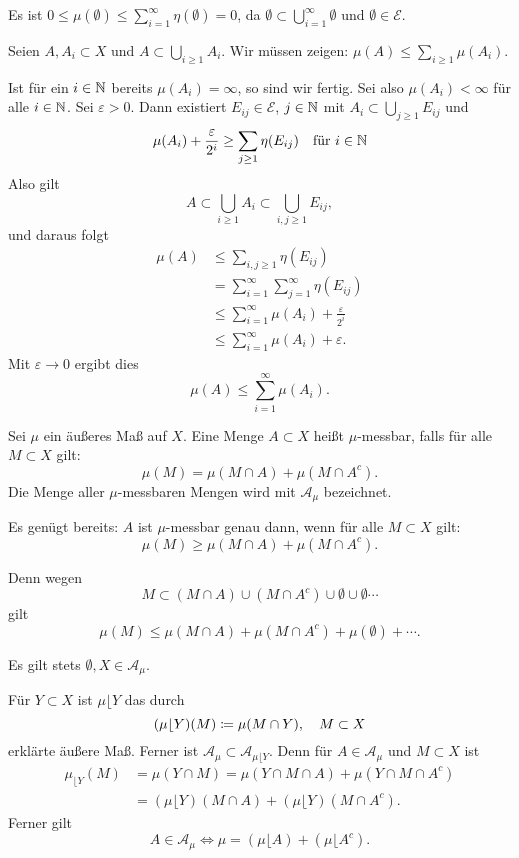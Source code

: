 \documentclass[a4paper,twoside,DIV15,BCOR12mm]{scrbook}
\newcommand{\A}{\mathcal A}
\newcommand{\MR}{\lfloor}
\begin{document}
\begin{beweis}
Es ist $0\le \mu(\emptyset) \le \sum_{i=1}^\infty \eta(\emptyset)=0$, da $\emptyset \subset \bigcup_{i=1}^\infty\emptyset$ und $\emptyset\in\mathcal E$.

Seien $A, A_i\subset X$ und $A\subset \bigcup_{i\ge1}A_i$. Wir müssen zeigen: $\mu(A) \le \sum_{i\ge 1}\mu(A_i)$.

Ist für ein $i\in\mathbb{N}$ bereits $\mu(A_i)=\infty$, so sind wir fertig. Sei also $\mu(A_i)<\infty$ für alle $i\in\mathbb{N}$. Sei $\varepsilon>0$. Dann existiert $E_{ij}\in \mathcal E$, $j\in \mathbb{N}$ mit $A_i\subset \bigcup_{j\ge 1} E_{ij}$ und
\[
\mu(A_i) + \frac{\varepsilon}{2^i}\ge \sum_{j\ge 1}\eta(E_{ij}) \quad \text{für $i\in \mathbb{N}$}
\]
Also gilt
\[
A \subset \bigcup_{i\ge 1} A_i \subset \bigcup_{i,j\ge 1} E_{ij},
\]
und daraus folgt
\begin{align*}
\mu(A) &\le \sum_{i,j\ge 1}\eta(E_{ij}) \\
&= \sum_{i=1}^\infty \sum_{j=1}^\infty \eta(E_{ij}) \\
&\le \sum_{i=1}^\infty \mu(A_i) + \frac\varepsilon{2^i} \\
&\le \sum_{i=1}^\infty \mu(A_i) + \varepsilon.
\end{align*}
Mit $\varepsilon \to 0$ ergibt dies
\[
\mu(A) \le \sum_{i=1}^\infty \mu(A_i).
\]
\end{beweis}

\begin{definition}
Sei $\mu$ ein äußeres Maß auf $X$. Eine Menge $A\subset X$ heißt $\mu$-messbar, falls für alle $M\subset X$ gilt:
\[
\mu(M) = \mu(M\cap A) + \mu(M \cap A^c).
\]
Die Menge aller $\mu$-messbaren Mengen wird mit $\A_\mu$ bezeichnet.
\end{definition}

Es genügt bereits: $A$ ist $\mu$-messbar genau dann, wenn für alle $M\subset X$ gilt:
\[
\mu(M) \ge \mu(M\cap A) + \mu(M\cap A^c).
\]

Denn wegen
\[
M\subset (M\cap A) \cup (M\cap A^c) \cup \emptyset \cup \emptyset\cdots
\]
gilt 
\[
\mu(M)\le \mu(M\cap A) + \mu(M\cap A^c) + \mu(\emptyset) + \cdots.
\]

Es gilt stets $\emptyset, X\in\A_\mu$.

\begin{bemerkung}
Für $Y\subset X$ ist $\mu \MR Y$ das durch
\[
(\mu \MR Y)(M) \da \mu(M\cap Y),\quad M\subset X
\]
erklärte äußere Maß. Ferner ist $\A_\mu \subset \A_{\mu \MR Y}$. Denn für $A\in\A_\mu$ und $M\subset X$ ist
\begin{align*}
\mu_{\MR Y}(M)
&= \mu(Y\cap M) = \mu(Y\cap M\cap A) + \mu(Y\cap M \cap A^c) \\
&= (\mu \MR Y) (M\cap A) + (\mu \MR Y)(M\cap A^c).
\end{align*}
Ferner gilt
\[
A \in \A_\mu \iff \mu= (\mu \MR A) + (\mu \MR  A^c).
\]
\end{bemerkung}
\end{document}
